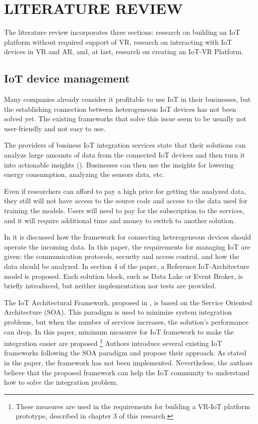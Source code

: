 
\chapter{LITERATURE REVIEW}


The literature review incorporates three sections: research on building an IoT platform without required support of VR, research on interacting with IoT devices in VR and AR, and, at last, research on creating an IoT-VR Platform.

\section{IoT device management}

Many companies already consider it profitable to use IoT in their businesses, but the establishing connection between heterogeneous IoT devices has not been solved yet. The existing frameworks that solve this issue seem to be usually not user-friendly and not easy to use. 

The providers of business IoT integration services state that their solutions can analyze large amounts of data from the connected IoT devices and then turn it into actionable insights (\cite{software_ag_software_2020}). Businesses can then use the insights for lowering energy consumption, analyzing the sensors data, etc.

Even if researchers can afford to pay a high price for getting the analyzed data, they still will not have access to the source code and access to the data used for training the models. Users will need to pay for the subscription to the services, and it will require additional time and money to switch to another solution.

In \cite{k_mohapatra_solution_2016} it is discussed how the framework for connecting heterogeneous devices should operate the incoming data. In this paper, the requirements for managing IoT are given: the communication protocols, security and access control, and how the data should be analyzed. In section 4 of the paper, a Reference IoT-Architecture model is proposed. Each solution block, such as Data Lake or Event Broker, is briefly introduced, but neither implementation nor tests are provided.

The IoT Architectural Framework, proposed in \cite{uviase_iot_2018}, is based on the Service Oriented Architecture (SOA). This paradigm is used to minimize system integration problems, but when the number of services increases, the solution's performance can drop. In this paper, minimum measures for IoT framework to make the integration easier are proposed \footnote{These measures are used in the requirements for building a VR-IoT platform prototype, described in chapter 3 of this research.} Authors introduce several existing IoT frameworks following the SOA paradigm and propose their approach. As stated in the paper, the framework has not been implemented.  Nevertheless, the authors believe that the proposed framework can help the IoT community to understand how to solve the integration problem.

